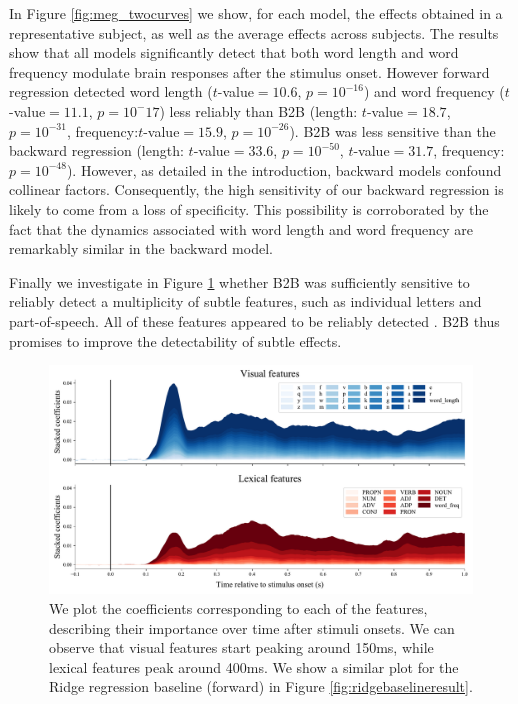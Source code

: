 In Figure \ref{fig:meg_twocurves} we show, for each model, the effects obtained
in a representative subject, as well as the average effects across subjects.
The results show that all models significantly detect that both word length and
word frequency modulate brain responses after the stimulus onset. However
forward regression detected word length ($t$-value$=10.6$, $p=10^{-16}$) and
word frequency ($t$-value$=11.1$, $p=10^-17$) less reliably than B2B (length:
$t$-value$=18.7$, $p=10^{-31}$, frequency:$t$-value$=15.9$, $p=10^{-26}$). B2B
was less sensitive than the backward regression (length: $t$-value$=33.6$,
$p=10^{-50}$, $t$-value$=31.7$, frequency:$p=10^{-48}$). However, as detailed in
the introduction, backward models confound collinear factors. Consequently,
the high sensitivity of our backward regression is likely to come from a loss of specificity. This possibility is corroborated by the fact that the dynamics
associated with word length and word frequency are remarkably similar in the
backward model.

Finally we investigate in Figure \ref{fig:megresult} whether B2B was sufficiently sensitive to reliably detect a multiplicity of subtle features, such as individual letters and part-of-speech. All of these features appeared to be reliably detected \cite{fig:megbar}. B2B thus promises to improve the detectability of subtle effects.

\begin{figure}
  \centering
  \includegraphics[width=\textwidth, trim=0cm 0cm 0cm 0cm, clip=True]{figures/meg_result.pdf}
  \caption{We plot the coefficients corresponding to each of the features,
  describing their importance over time after stimuli onsets. We can observe that visual features start peaking around 150ms, while lexical features peak around 400ms. We show a similar plot for the Ridge regression baseline (forward) in Figure \ref{fig:ridgebaselineresult}.}
  \label{fig:megresult}
\end{figure}

